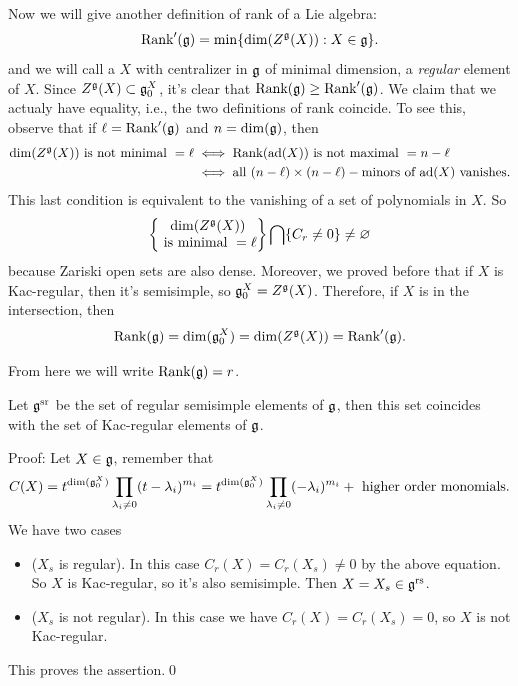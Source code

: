 Now we will give another definition of rank of a Lie algebra: 
\begin{equation}
    \text{Rank}^\prime(\mathfrak{g})=\min\{\dim(Z^{\mathfrak{g}}(X)):X\in\mathfrak{g}\}.
\end{equation}
and we will call a $X$ with centralizer in $\mathfrak{g}$ of minimal dimension, a \textit{regular} element of $X$.
Since $Z^{\mathfrak{g}}(X)\subset \mathfrak{g}_0^X$, it's clear that $\text{Rank}(\mathfrak{g})\geq \text{Rank}^\prime(\mathfrak{g})$. We claim 
that we actualy have equality, i.e., the two definitions of rank coincide. To see this, observe that if 
$\ell=\text{Rank}^\prime(\mathfrak{g})$ and $n=\dim(\mathfrak{g})$, then
\begin{equation}
    \begin{split}
       \dim(Z^{\mathfrak{g}}(X)) \text{ is not minimal }=\ell&\iff \text{Rank}(\text{ad}(X))\text{ is not maximal } = n-\ell\\
        &\iff \text{all }(n-\ell)\times(n-\ell)-\text{minors of }\text{ad}(X)\text{ vanishes}.
    \end{split}
\end{equation} 
This last condition is equivalent to the vanishing of a set of polynomials in $X$. So 
\begin{equation}
    \left\{\begin{matrix}
      \dim(Z^{\mathfrak{g}}(X))  \\
      \text{ is minimal }=\ell
    \end{matrix}\right\}\bigcap \{C_r\neq0\}\neq\varnothing
\end{equation}
because Zariski open sets are also dense. Moreover, we proved before that if $X$ is Kac-regular, then it's semisimple, so 
$\mathfrak{g}_0^X=Z^{\mathfrak{g}}(X)$. Therefore, if $X$ is in the intersection, then 
\begin{equation}
    \text{Rank}(\mathfrak{g})=\dim(\mathfrak{g}_0^X)=\dim(Z^{\mathfrak{g}}(X))=\text{Rank}^\prime(\mathfrak{g}).
\end{equation}

From here we will write $\text{Rank}(\mathfrak{g})=r$.

\begin{dang}
    \begin{theorem}
        Let $\mathfrak{g}^{\text{sr}}$ be the set of regular semisimple elements of $\mathfrak{g}$, then this set coincides 
        with the set of Kac-regular elements of $\mathfrak{g}$.
    \end{theorem}
\end{dang}
Proof: Let $X\in\mathfrak{g}$, remember that 
\begin{equation}
    C(X)=t^{\dim(\mathfrak{g}_0^X)}\prod_{\lambda_i\neq0}(t-\lambda_i)^{m_i}
    =t^{\dim(\mathfrak{g}_0^X)}\prod_{\lambda_i\neq0}(-\lambda_i)^{m_i}+\text{ higher order monomials}.
\end{equation}
We have two cases 
\begin{itemize}
    \item($X_s$ is regular). In this case $C_r(X)=C_r(X_s)\neq0$ by the above equation. So 
    $X$ is Kac-regular, so it's also semisimple. Then $X=X_s\in\mathfrak{g}^{\text{rs}}$.
    \item($X_s$ is not regular).  In this case we have $C_r(X)=C_r(X_s)=0$, so $X$ is not Kac-regular.
\end{itemize}
This proves the assertion.\qed



